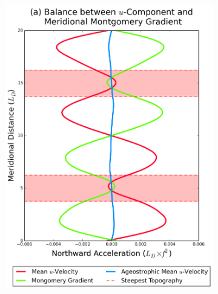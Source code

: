 \documentclass[12pt,a4paper]{report}
\begin{document}
 \begin{figure}
 	\centering
 	\begin{subfigure}{0.46\linewidth}
 		\centering
 		\includegraphics[width=\linewidth ]{vgeo_3}
 		\label{fig:vgeolayer3}
 	\end{subfigure}
 	\quad
 	\begin{subfigure}{0.46\linewidth}
 		\centering

\end{subfigure}
\end{figure}
\end{document}
